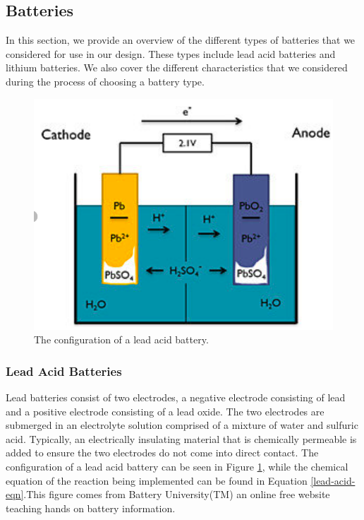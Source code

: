 \subsection{Batteries}
In this section, we provide an overview of the different types of batteries that we considered for use in our design. These types include lead acid batteries and lithium batteries. We also cover the different characteristics that we considered during the process of choosing a battery type.

\begin{figure}
    \centering
    \includegraphics[scale=0.25]{figures/lead-acid-battery.png}
    \caption{The configuration of a lead acid battery.}
    \label{lead-acid-battery} 
\end{figure}

\subsubsection{Lead Acid Batteries}
Lead batteries consist of two electrodes, a negative electrode consisting of lead and a positive electrode consisting of a lead oxide. The two electrodes are submerged in an electrolyte solution comprised of a mixture of water and sulfuric acid. Typically, an electrically insulating material that is chemically permeable is added to ensure the two electrodes do not come into direct contact. The configuration of a lead acid battery can be seen in Figure \ref{lead-acid-battery}, while the chemical equation of the reaction being implemented can be found in Equation \ref{lead-acid-eqn}.This figure comes from Battery University(TM) an online free website teaching hands on battery information. 

